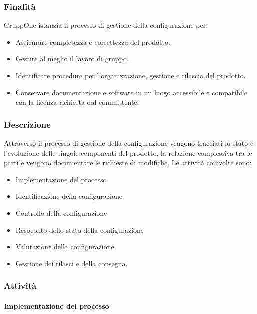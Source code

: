 \documentclass[../../norme-di-progetto.tex]{subfiles}
\begin{document}
\subsubsection{Finalità}%
\label{subs:gestione_della_configurazione/finalita}

GruppOne istanzia il processo di gestione della configurazione per:
\begin{itemize}
  \item Assicurare completezza e correttezza del prodotto.
  \item Gestire al meglio il lavoro di gruppo.
  \item Identificare procedure per l'organizzazione, gestione e rilascio del prodotto.
  \item Conservare documentazione e software in un luogo accessibile e compatibile con la licenza richiesta dal committente.
\end{itemize}

\subsubsection{Descrizione}%
\label{subs:gestione_della_configurazione/descrizione}

Attraverso il processo di gestione della configurazione vengono tracciati lo stato e l'evoluzione delle singole componenti del prodotto, la relazione complessiva tra le parti e vengono documentate le richieste di modifiche.
Le attività coinvolte sono:

\begin{itemize}
  \item Implementazione del processo
  \item Identificazione della configurazione
  \item Controllo della configurazione
  \item Resoconto dello stato della configurazione
  \item Valutazione della configurazione
  \item Gestione dei rilasci e della consegna.
\end{itemize}

\subsubsection{Attività}%
\label{subs:gestione_della_configurazione/attivita}

\paragraph{Implementazione del processo}%
\label{par:implementazione_del_processo}
\end{document}
